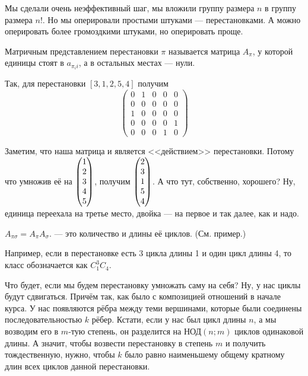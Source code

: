\documentclass{article}
\begin{document}
\begin{itemize}
\begin{Comment}
            Мы сделали очень неэффективный шаг, мы вложили группу размера $n$ в группу размера $n!$. Но мы оперировали простыми штуками --- перестановками. А можно оперировать более громоздкими штуками, но оперировать проще.
        \end{Comment}
        \dfn Матричным представлением перестановки $\pi$ называется матрица $A_\pi$, у которой единицы стоят в $a_{\pi_ii}$, а в остальных местах --- нули.
        \begin{Example}
            Так, для перестановки $[3,1,2,5,4]$ получим
            \[
            \left(\begin{matrix}
                0 & 1 & 0 & 0 & 0\\
                0 & 0 & 0 & 0 & 0\\
                1 & 0 & 0 & 0 & 0\\
                0 & 0 & 0 & 0 & 1\\
                0 & 0 & 0 & 1 & 0
            \end{matrix}\right)
            \]
        \end{Example}
        \begin{Comment}
            Заметим, что наша матрица и является <<действием>> перестановки. Потому что умножив её на $\left(\begin{matrix}1\\2\\3\\4\\5\end{matrix}\right)$, получим $\left(\begin{matrix}2\\3\\1\\5\\4\end{matrix}\right)$. А что тут, собственно, хорошего? Ну, единица переехала на третье место, двойка --- на первое и так далее, как и надо.
        \end{Comment}
        \thm $A_{\pi\sigma}=A_\pi A_\sigma$.
        \dfn {} --- это количество и длины её циклов. (См. пример.)
        \begin{Example}
            Например, если в перестановке есть 3 цикла длины 1 и один цикл длины 4, то класс обозначается как $C_1^3C_4$.
        \end{Example}
        \begin{Comment}
            Что будет, если мы будем перестановку умножать саму на себя? Ну, у нас циклы будут сдвигаться. Причём так, как было с композицией отношений в начале курса. У нас появляются рёбра между теми вершинами, которые были соединены последовательностью $k$ рёбер. Кстати, если у нас был цикл длины $n$, а мы возводим его в $m$-тую степень, он разделится на $\text{НОД}(n;m)$ циклов одинаковой длины. А значит, чтобы возвести перестановку в степень $m$ и получить тождественную, нужно, чтобы $k$ было равно наименьшему общему кратному длин всех циклов данной перестановки.

\end{Comment}
\end{itemize}
\end{document}
